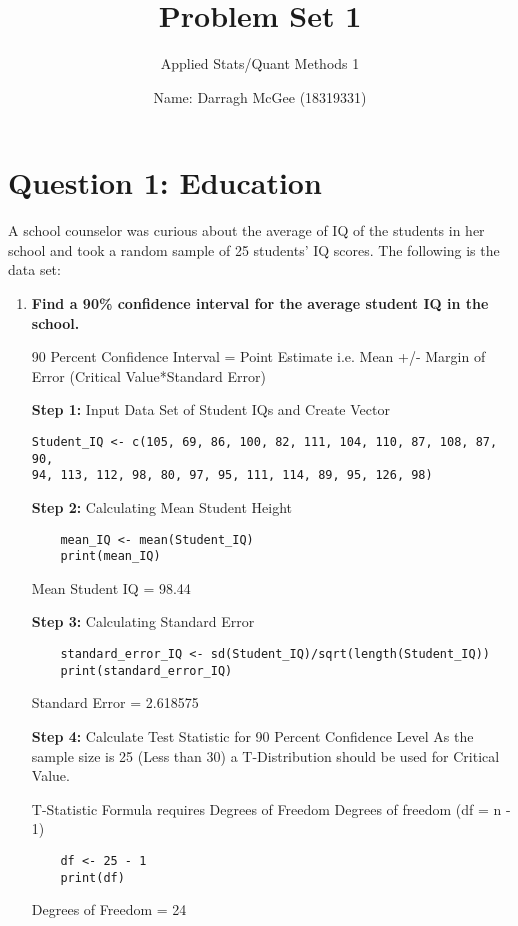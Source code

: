 \documentclass[12pt,letterpaper]{article}
\title{Problem Set 1}
\date{
	Name: Darragh McGee (18319331)\\
}
\author{Applied Stats/Quant Methods 1}
\begin{document}
	\maketitle

	\section*{Question 1: Education}

A school counselor was curious about the average of IQ of the students in her school and took a random sample of 25 students' IQ scores. The following is the data set:\\
\vspace{.5cm}
  
\vspace{.5cm}
\begin{enumerate}
	\item \textbf{Find a 90\% confidence interval for the average student IQ in the school.}
	
90 Percent Confidence Interval = Point Estimate i.e. Mean +/- Margin of Error (Critical Value*Standard Error)

\vspace{.5cm}
\textbf{Step 1:} Input Data Set of Student IQs and Create Vector
\begin{verbatim}
Student_IQ <- c(105, 69, 86, 100, 82, 111, 104, 110, 87, 108, 87, 90, 
94, 113, 112, 98, 80, 97, 95, 111, 114, 89, 95, 126, 98)
\end{verbatim}

\textbf{Step 2:} Calculating Mean Student Height
\begin{verbatim}
	mean_IQ <- mean(Student_IQ)
	print(mean_IQ)
\end{verbatim}
Mean Student IQ =  98.44

\vspace{.5cm}
\textbf{Step 3:} Calculating Standard Error
\begin{verbatim}
	standard_error_IQ <- sd(Student_IQ)/sqrt(length(Student_IQ))
	print(standard_error_IQ)
\end{verbatim}
Standard Error = 2.618575

\vspace{.5cm}
\textbf{Step 4:} Calculate Test Statistic for 90 Percent Confidence Level
As the sample size is 25 (Less than 30) a T-Distribution should be used for Critical Value.  

T-Statistic Formula requires Degrees of Freedom
Degrees of freedom (df = n - 1)
\begin{verbatim}
	df <- 25 - 1
	print(df)
\end{verbatim}
Degrees of Freedom = 24


\end{enumerate}
\end{document}
